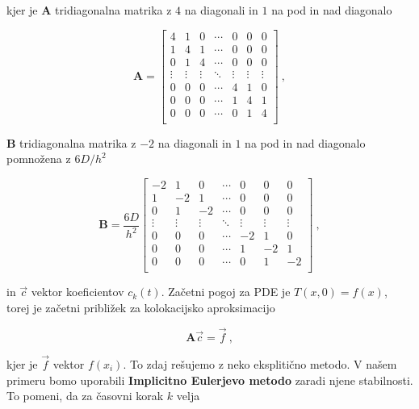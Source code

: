 \documentclass[a4paper]{article}
\begin{document}
kjer je $\mathbf{A}$ tridiagonalna matrika z $4$ na diagonali in $1$ na pod in nad diagonalo

\begin{equation}
    \mathbf{A}=\begin{bmatrix}
        4 & 1 & 0 & \cdots & 0 & 0 & 0\\
        1 & 4 & 1 & \cdots & 0 & 0 & 0\\
        0 & 1 & 4 & \cdots & 0 & 0 & 0\\
        \vdots & \vdots & \vdots & \ddots & \vdots & \vdots & \vdots\\
        0 & 0 & 0 & \cdots & 4 & 1 & 0\\
        0 & 0 & 0 & \cdots & 1 & 4 & 1\\
        0 & 0 & 0 & \cdots & 0 & 1 & 4\\
    \end{bmatrix}\>,
\end{equation}

$\mathbf{B}$ tridiagonalna matrika z $-2$ na diagonali in $1$ na pod in nad diagonalo pomnožena z $6D/h^2$

\begin{equation}
    \mathbf{B}=\frac{6D}{h^2}\begin{bmatrix}
        -2 & 1 & 0 & \cdots & 0 & 0 & 0\\
        1 & -2 & 1 & \cdots & 0 & 0 & 0\\
        0 & 1 & -2 & \cdots & 0 & 0 & 0\\
        \vdots & \vdots & \vdots & \ddots & \vdots & \vdots & \vdots\\
        0 & 0 & 0 & \cdots & -2 & 1 & 0\\
        0 & 0 & 0 & \cdots & 1 & -2 & 1\\
        0 & 0 & 0 & \cdots & 0 & 1 & -2\\
    \end{bmatrix}\>,
\end{equation}

in $\vec{c}$ vektor koeficientov $c_k(t)$. Začetni pogoj za PDE je $T(x, 0) = f(x)$, torej je začetni približek
za kolokacijsko aproksimacijo

\begin{equation}
    \mathbf{A}\vec{c} = \vec{f}\>,
\end{equation}

kjer je $\vec{f}$ vektor $f(x_i)$. To zdaj rešujemo z neko eksplitično metodo. V našem primeru bomo uporabili
\textbf{Implicitno Eulerjevo metodo} zaradi njene stabilnosti. To pomeni, da za časovni korak $k$ velja
\end{document}
